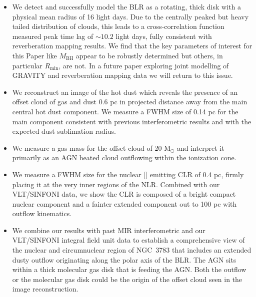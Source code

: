 \documentclass[longauth,]{aa}
\newcommand{\caviii}{[\ion{Ca}{viii}]}
\newcommand{\mbh}{{\mbox{$M_\mathrm{BH}$}}}
\begin{document}
\begin{itemize}
    \item We detect and successfully model the BLR as a rotating, thick disk with a physical mean radius of 16 light days. Due to the centrally peaked but heavy tailed distribution of clouds, this leads to a cross-correlation function measured peak time lag of $\sim10.2$ light days, fully consistent with reverberation mapping results. We find that the key parameters of interest for this Paper like \mbh{} appear to be robustly determined but others, in particular $R_\mathrm{min}$, are not. In a future paper exploring joint modelling of GRAVITY and reverberation mapping data we will return to this issue.
    
    \item We reconstruct an image of the hot dust which reveals the presence of an offset cloud of gas and dust 0.6 pc in projected distance away from the main central hot dust component. We measure a FWHM size of 0.14 pc for the main component consistent with previous interferometric results and with the expected dust sublimation radius.
    
    \item We measure a gas mass for the offset cloud of 20 M$_{\odot}$ and interpret it primarily as an AGN heated cloud outflowing within the ionization cone.
    
    \item We measure a FWHM size for the nuclear \caviii{} emitting CLR of 0.4 pc, firmly placing it at the very inner regions of the NLR. Combined with our VLT/SINFONI data, we show the CLR is composed of a bright compact nuclear component and a fainter extended component out to 100 pc with outflow kinematics.
    
    \item We combine our results with past MIR interferometric and our VLT/SINFONI integral field unit data to establish a comprehensive view of the nuclear and circumnuclear region of NGC~3783 that includes an extended dusty outflow originating along the polar axis of the BLR. The AGN sits within a thick molecular gas disk that is feeding the AGN. Both the outflow or the molecular gas disk could be the origin of the offset cloud seen in the image reconstruction.

\end{itemize}
\end{document}
